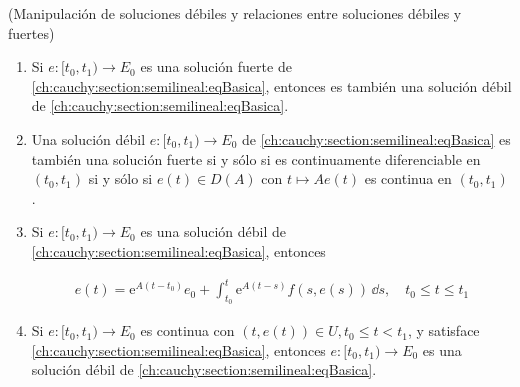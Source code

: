 \begin{Teorema}{(Manipulación de soluciones débiles y relaciones entre soluciones débiles y fuertes)}
    \label{ch:cauchy:section:semilineal:th:solDebilYFuerteRels}

    \begin{enumerate}
        \item Si $e : [t_0, t_1) \rightarrow E_0$ es una solución fuerte de \eqref{ch:cauchy:section:semilineal:eqBasica}, entonces es también una solución débil de \eqref{ch:cauchy:section:semilineal:eqBasica}.

        \item Una solución débil $e : [t_0, t_1) \rightarrow E_0$ de \eqref{ch:cauchy:section:semilineal:eqBasica} es también una solución fuerte si y sólo si es continuamente diferenciable en $(t_0, t_1)$ si y sólo si $e(t) \in D(A)$ con $t \mapsto Ae(t)$ es continua en $(t_0, t_1)$.

        \item Si $e : [t_0, t_1) \rightarrow E_0$ es una solución débil de \eqref{ch:cauchy:section:semilineal:eqBasica}, entonces

        \begin{align}
            \label{ch:cauchy:section:semilineal:th:solDebilYFuerteRels:2}
            e(t) = \mathrm{e}^{A(t-t_0)}e_0 + \int_{t_0}^{t}\mathrm{e}^{A(t-s)}f(s, e(s)) \, \dd s, \quad t_0 \leq t \leq t_1
        \end{align}

        \item Si $e : [t_0, t_1) \rightarrow E_0$ es continua con $(t,e(t)) \in U, t_0 \leq t < t_1$, y satisface \eqref{ch:cauchy:section:semilineal:eqBasica}, entonces $e : [t_0, t_1) \rightarrow E_0$ es una solución débil de \eqref{ch:cauchy:section:semilineal:eqBasica}.
    \end{enumerate}
\end{Teorema}

